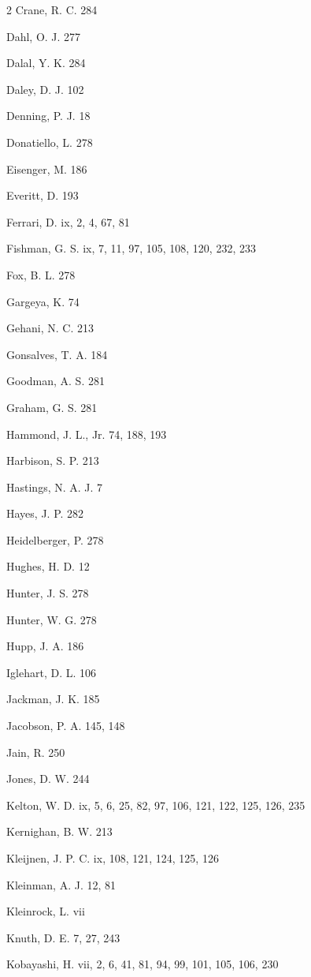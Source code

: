 \begin{multicols}{2}
\noindent Crane, R. C. 284\par
\noindent Dahl, O. J. 277\par
\noindent Dalal, Y. K. 284\par
\noindent Daley, D. J. 102\par
\noindent Denning, P. J. 18\par
\noindent Donatiello, L. 278\par
\columnbreak
\noindent Eisenger, M. 186\par
\noindent Everitt, D. 193\par
\noindent Ferrari, D. ix, 2, 4, 67, 81\par
\noindent Fishman, G. S. ix, 7, 11, 97, 105, 108, 120, 232, 233\par
\noindent Fox, B. L. 278\par
\noindent Gargeya, K. 74\par
\noindent Gehani, N. C. 213\par
\noindent Gonsalves, T. A. 184\par
\noindent Goodman, A. S. 281\par
\noindent Graham, G. S. 281\par
\noindent Hammond, J. L., Jr. 74, 188, 193\par
\noindent Harbison, S. P. 213\par
\noindent Hastings, N. A. J. 7\par
\noindent Hayes, J. P. 282\par
\noindent Heidelberger, P. 278\par
\noindent Hughes, H. D. 12\par
\noindent Hunter, J. S. 278\par
\noindent Hunter, W. G. 278\par
\noindent Hupp, J. A. 186\par
\noindent Iglehart, D. L. 106\par
\noindent Jackman, J. K. 185\par
\noindent Jacobson, P. A. 145, 148\par
\noindent Jain, R. 250\par
\noindent Jones, D. W. 244\par
\noindent Kelton, W. D. ix, 5, 6, 25, 82, 97, 106, 121, 122, 125, 126, 235\par
\noindent Kernighan, B. W. 213\par
\noindent Kleijnen, J. P. C. ix, 108, 121, 124, 125, 126\par
\noindent Kleinman, A. J. 12, 81\par
\noindent Kleinrock, L. vii\par
\noindent Knuth, D. E. 7, 27, 243\par
\noindent Kobayashi, H. vii, 2, 6, 41, 81, 94, 99, 101, 105, 106, 230\par
\end{multicols}
